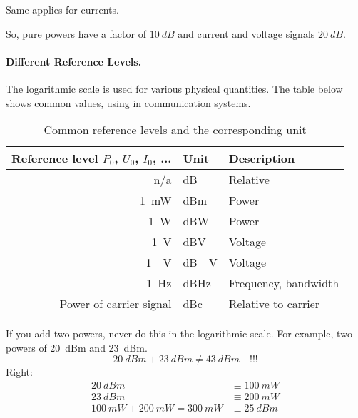 \begin{refsection}
Same applies for currents.

So, pure powers have a factor of $\SI{10}{dB}$ and current and voltage signals $\SI{20}{dB}$.

\paragraph{Different Reference Levels.}

The logarithmic scale is used for various physical quantities. The table below shows common values, using in communication systems.

\begin{table}[H]
	\centering
	\caption{Common reference levels and the corresponding unit}
	\begin{tabular}{|r|l|l|}
		\hline
		Reference level $P_0$, $U_0$, $I_0$, ... & Unit & Description \\
		\hline
		\hline
		n/a & \si{dB} & Relative \\
		\hline
		\SI{1}{mW} & \si{dBm} & Power \\
		\hline
		\SI{1}{W} & \si{dBW} & Power \\
		\hline
		\SI{1}{V} & \si{dBV} & Voltage \\
		\hline
		\SI{1}{\micro.V} & \si{dB\micro.V} & Voltage \\
		\hline
		\SI{1}{Hz} & \si{dBHz} & Frequency, bandwidth \\
		\hline
		Power of carrier signal & \si{dBc} & Relative to carrier \\
		\hline
	\end{tabular}
\end{table}

\begin{attention}
	If you add two powers, never do this in the logarithmic scale. For example, two powers of \SI{20}{dBm} and \SI{23}{dBm}.
	\begin{equation*}
		\SI{20}{dBm} + \SI{23}{dBm} \neq \SI{43}{dBm} \quad \text{!!!}
	\end{equation*}
	Right:
	\begin{equation*}
		\begin{split}
			\SI{20}{dBm} &\equiv \SI{100}{mW} \\
			\SI{23}{dBm} &\equiv \SI{200}{mW} \\
			\SI{100}{mW} + \SI{200}{mW} = \SI{300}{mW} &\equiv \SI{25}{dBm} \\
		\end{split}
	\end{equation*}
\end{attention}


\end{refsection}
